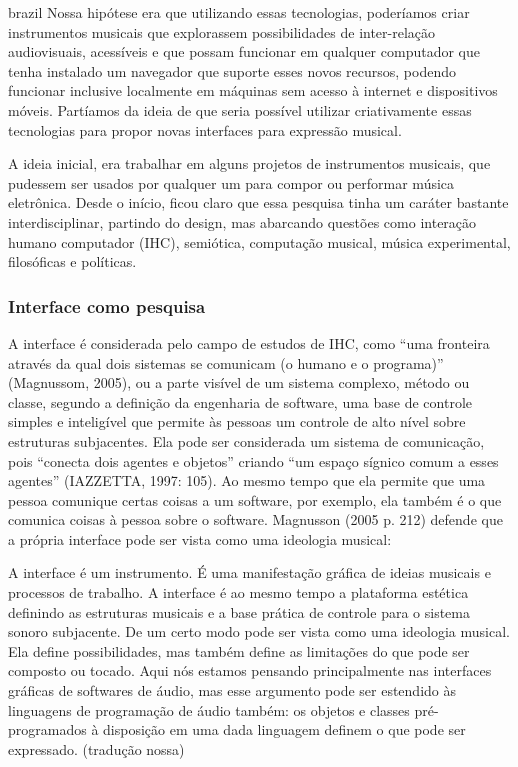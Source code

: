 \begin{otherlanguage*}{brazil}
Nossa hipótese era que utilizando essas tecnologias, poderíamos criar instrumentos musicais que explorassem possibilidades de inter-relação audiovisuais, acessíveis e que possam funcionar em qualquer computador que tenha instalado um navegador que suporte esses novos recursos, podendo funcionar inclusive localmente em máquinas sem acesso à internet e dispositivos móveis. Partíamos da ideia de que seria possível utilizar criativamente essas tecnologias para propor novas interfaces para expressão musical.
    
A ideia inicial, era trabalhar em alguns projetos de instrumentos musicais, que pudessem ser usados por qualquer um para compor ou performar música eletrônica. Desde o início, ficou claro que essa pesquisa tinha um caráter bastante interdisciplinar, partindo do design, mas abarcando questões como interação humano computador (IHC), semiótica, computação musical, música experimental, filosóficas e políticas. 

\subsubsection{Interface como pesquisa}
A interface é considerada pelo campo de estudos de IHC, como “uma fronteira através da qual dois sistemas se comunicam (o humano e o programa)” (Magnussom, 2005), ou a parte visível de um sistema complexo, método ou classe, segundo a definição da engenharia de software, uma base de controle simples e inteligível que permite às pessoas um controle de alto nível sobre estruturas subjacentes. Ela pode ser considerada um sistema de comunicação, pois “conecta dois agentes e objetos” criando “um espaço sígnico comum a esses agentes” (IAZZETTA, 1997: 105). Ao mesmo tempo que ela permite que uma pessoa comunique certas coisas a um software, por exemplo, ela também é o que comunica coisas à pessoa sobre o software. Magnusson (2005 p. 212) defende que a própria interface pode ser vista como uma ideologia musical: 

\begin{citacao}
A interface é um instrumento. É uma manifestação gráfica de ideias musicais e processos de trabalho. A interface é ao mesmo tempo a plataforma estética definindo as estruturas musicais e a base prática de controle para o sistema sonoro subjacente. De um certo modo pode ser vista como uma ideologia musical. Ela define possibilidades, mas também define as limitações do que pode ser composto ou tocado. Aqui nós estamos pensando principalmente nas interfaces gráficas de softwares de áudio, mas esse argumento pode ser estendido às linguagens de programação de áudio também: os objetos e classes pré-programados à disposição em uma dada linguagem definem o que pode ser expressado. (tradução nossa)
\end{citacao}


\end{otherlanguage*}
